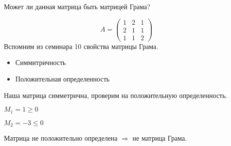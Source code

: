 \begin{prim}
Может ли данная матрица быть матрицей Грама?

$$A=\left(\begin{array}{rrr}
    1 & 2&1 \\
     2&1&1\\
     1&1&2
\end{array}\right)$$
Вспомним из семинара 10 свойства матрицы Грама.
\begin{itemize}
    \item Симмитричность 
    \item Положительная определенность
\end{itemize}

Наша матрица симметрична, проверим на положительную определенность.

$M_1=1\geq0 $

$M_2=-3\leq0$

Матрица не положительно определена $\Rightarrow$ не матрица Грама.
\end{prim}

